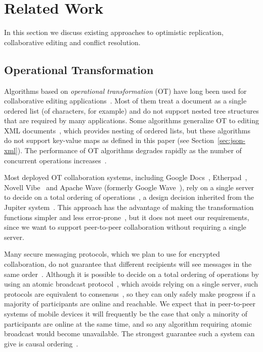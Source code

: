 \documentclass[10pt,journal,compsoc]{IEEEtran}
\begin{document}
\section{Related Work}\label{sec:related}

In this section we discuss existing approaches to optimistic replication, collaborative editing and conflict resolution.

\subsection{Operational Transformation}\label{sec:related-ot}

Algorithms based on \emph{operational transformation} (OT) have long been used for collaborative editing applications~\cite{Ellis:1989ue,Ressel:1996wx,Sun:1998vf,Nichols:1995fd}. Most of them treat a document as a single ordered list (of characters, for example) and do not support nested tree structures that are required by many applications. Some algorithms generalize OT to editing XML documents~\cite{Davis:2002iv,Ignat:2003jy,Wang:2015vo}, which provides nesting of ordered lists, but these algorithms do not support key-value maps as defined in this paper (see Section~\ref{sec:json-xml}). The performance of OT algorithms degrades rapidly as the number of concurrent operations increases~\cite{Li:2006kd,Mehdi:2011ke}.

Most deployed OT collaboration systems, including Google Docs~\cite{DayRichter:2010tt}, Etherpad~\cite{Etherpad:2011um}, Novell Vibe~\cite{Spiewak:2010vw} and Apache Wave (formerly Google Wave~\cite{Wang:2015vo}), rely on a single server to decide on a total ordering of operations~\cite{Lemonik:2016wh}, a design decision inherited from the Jupiter system~\cite{Nichols:1995fd}. This approach has the advantage of making the transformation functions simpler and less error-prone~\cite{Imine:2003ks}, but it does not meet our requirements, since we want to support peer-to-peer collaboration without requiring a single server.

Many secure messaging protocols, which we plan to use for encrypted collaboration, do not guarantee that different recipients will see messages in the same order~\cite{Unger:2015kg}. Although it is possible to decide on a total ordering of operations by using an atomic broadcast protocol~\cite{Defago:2004ji}, which avoids relying on a single server, such protocols are equivalent to consensus~\cite{Chandra:1996cp}, so they can only safely make progress if a majority of participants are online and reachable. We expect that in peer-to-peer systems of mobile devices it will frequently be the case that only a minority of participants are online at the same time, and so any algorithm requiring atomic broadcast would become unavailable. The strongest guarantee such a system can give is causal ordering~\cite{Attiya:2015dm}.
\end{document}
